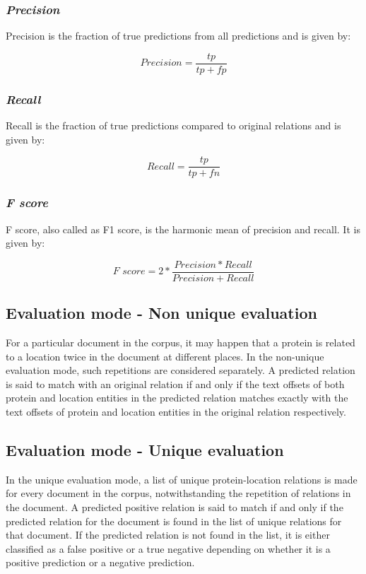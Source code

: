 \subsubsection*{\textit{Precision}}

Precision is the fraction of true predictions from all predictions and is given by:

$$
\textit{Precision} = \frac{tp}{tp+fp}
$$


\subsubsection*{\textit{Recall}}

Recall is the fraction of true predictions compared to original relations and is given by:

$$
\textit{Recall} = \frac{tp}{tp+fn}
$$

\subsubsection*{\textit{F score}}

F score, also called as F1 score, is the harmonic mean of precision and recall. It is given by:

$$
\textit{F score} = 2 * \frac{Precision * Recall}{Precision + Recall}
$$


\subsection{Evaluation mode - Non unique evaluation}

For a particular document in the corpus, it may happen that a protein is related to a location twice in the document at different places. In the non-unique evaluation mode, such repetitions are considered separately. A predicted relation is said to match with an original relation if and only if the text offsets of both protein and location entities in the predicted relation matches exactly with the text offsets of protein and location entities in the original relation respectively.


\subsection{Evaluation mode -  Unique evaluation}

In the unique evaluation mode, a list of unique protein-location relations is made for every document in the corpus, notwithstanding the repetition of relations in the document. A predicted positive relation is said to match if and only if the predicted relation for the document is found in the list of unique relations for that document. If the predicted relation is not found in the list, it is either classified as a false positive or a true negative depending on whether it is a positive prediction or a negative prediction.

